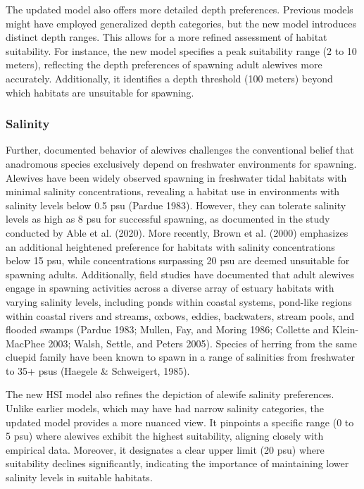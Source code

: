 \documentclass[
]{book}
\begin{document}
The updated model also offers more detailed depth preferences.
Previous models might have employed generalized depth categories, but the new model introduces distinct depth ranges.
This allows for a more refined assessment of habitat suitability.
For instance, the new model specifies a peak suitability range (2 to 10 meters), reflecting the depth preferences of spawning adult alewives more accurately.
Additionally, it identifies a depth threshold (100 meters) beyond which habitats are unsuitable for spawning.

\hypertarget{salinity-3}{%
\subsubsection{Salinity}\label{salinity-3}}

Further, documented behavior of alewives challenges the conventional belief that anadromous species exclusively depend on freshwater environments for spawning.
Alewives have been widely observed spawning in freshwater tidal habitats with minimal salinity concentrations, revealing a habitat use in environments with salinity levels below 0.5 psu (Pardue 1983).
However, they can tolerate salinity levels as high as 8 psu for successful spawning, as documented in the study conducted by Able et al. (2020). More recently, Brown et al. (2000) emphasizes an additional heightened preference for habitats with salinity concentrations below 15 psu, while concentrations surpassing 20 psu are deemed unsuitable for spawning adults.
Additionally, field studies have documented that adult alewives engage in spawning activities across a diverse array of estuary habitats with varying salinity levels, including ponds within coastal systems, pond-like regions within coastal rivers and streams, oxbows, eddies, backwaters, stream pools, and flooded swamps (Pardue 1983; Mullen, Fay, and Moring 1986; Collette and Klein-MacPhee 2003; Walsh, Settle, and Peters 2005). Species of herring from the same cluepid family have been known to spawn in a range of salinities from freshwater to 35+ psus (Haegele \& Schweigert, 1985).

The new HSI model also refines the depiction of alewife salinity preferences.
Unlike earlier models, which may have had narrow salinity categories, the updated model provides a more nuanced view.
It pinpoints a specific range (0 to 5 psu) where alewives exhibit the highest suitability, aligning closely with empirical data.
Moreover, it designates a clear upper limit (20 psu) where suitability declines significantly, indicating the importance of maintaining lower salinity levels in suitable habitats.
\end{document}
